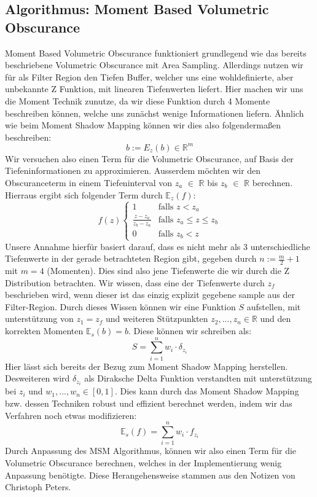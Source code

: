 \documentclass[runningheaders,a4paper]{llncs}
\begin{document}
\subsection{Algorithmus: Moment Based Volumetric Obscurance}
Moment Based Volumetric Obscurance funktioniert grundlegend wie das bereits beschriebene Volumetric Obscurance mit Area Sampling. Allerdings nutzen wir für als Filter Region den Tiefen Buffer, welcher uns eine wohldefinierte, aber unbekannte Z Funktion, mit linearen Tiefenwerten liefert. Hier machen wir uns die Moment Technik zunutze, da wir diese Funktion durch 4 Momente beschreiben können, welche uns zunächst wenige Informationen liefern. Ähnlich wie beim Moment Shadow Mapping können wir dies also folgendermaßen beschreiben:
$$ b := E_z(b) \in \mathbb{R}^m $$
Wir versuchen also einen Term für die Volumetric Obscurance, auf Basis der Tiefeninformationen zu approximieren. Ausserdem möchten wir den Obscuranceterm in einem Tiefeninterval von $z_a$ $\in$ $\mathbb{R}$ bis $z_b$ $\in$ $\mathbb{R}$ berechnen.
Hierraus ergibt sich folgender Term durch $\mathbb{E}_z(f)$: 
$$ f(z)
\begin{cases}
\phantom{} 1 & \text{falls } z < z_a\\ 
\frac{z-z_a}{z_b-z_a} & \text{falls } z_a \leq z \leq z_b\\
0 & \text{falls } z_b < z
\end{cases}
$$
Unsere Annahme hierfür basiert darauf, dass es nicht mehr als 3 unterschiedliche Tiefenwerte in der gerade betrachteten Region gibt, gegeben durch $n:=\frac{m}{2}+1$ mit $m=4$ (Momenten). Dies sind also jene Tiefenwerte die wir durch die Z Distribution betrachten. Wir wissen, dass eine der Tiefenwerte durch $z_f$ beschrieben wird, wenn dieser ist das einzig explizit gegebene sample aus der Filter-Region. Durch dieses Wissen können wir eine Funktion $S$ aufstellen, mit unterstützung von $z_1=z_f$ und weiteren Stützpunkten $z_2,...,z_n \in \mathbb{R}$  und den korrekten Momenten $\mathbb{E}_s(b)=b$. Diese können wir schreiben als:
$$ 
S = \sum_{i=1}^{n} w_i \cdot \delta_{z_i} 
$$
Hier lässt sich bereits der Bezug zum Moment Shadow Mapping herstellen. Desweiteren wird $\delta_{z_i}$ als Diraksche Delta Funktion verstandten mit unterstützung bei $z_i$ und $w_1,...,w_n \in [0,1]$.
Dies kann durch das Moment Shadow Mapping bzw. dessen Techniken robust und effizient berechnet werden, indem wir das Verfahren noch etwas modifizieren:
$$ 
\mathbb{E}_s(f) = \sum_{i=1}^{n} w_i \cdot f_{z_i} 
$$
Durch Anpassung des MSM Algorithmus, können wir also einen Term für die Volumetric Obscurance berechnen, welches in der Implementierung wenig Anpassung benötigte.
Diese Herangehensweise stammen aus den Notizen von Christoph Peters\cite{mbvo}.
\end{document}
